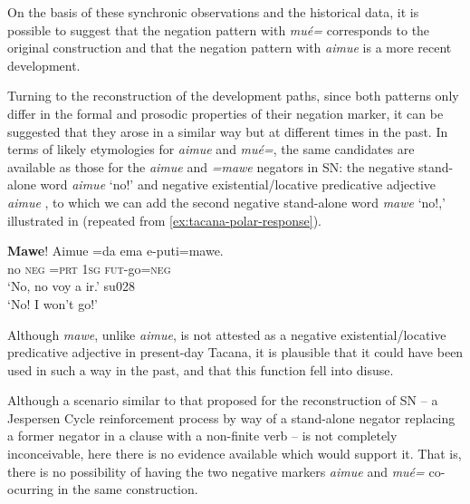 \documentclass[output=paper,draft,draftmode,colorlinks,citecolor=brown]{langscibook}
\begin{document}
On the basis of these synchronic observations and the historical data, it is possible to suggest that the negation pattern with \textit{mué=} corresponds to the original construction and that the negation pattern with \textit{aimue} is a more recent development.

Turning to the reconstruction of the development paths, since both patterns
only differ in the formal and prosodic properties of their negation marker,
it can be suggested that they arose in a similar way but at different
times in the past. In terms of likely etymologies for \textit{aimue} and
\textit{mué=}, the same candidates are available as those for the
\textit{aimue} and \textit{=mawe} negators in SN: the negative stand-alone
word \textit{aimue} `no!'  and negative
existential\slash locative predicative adjective \textit{aimue}
, to which we can add the second negative
stand-alone word \textit{mawe} `no!,' illustrated in
 (repeated from \ref{ex:tacana-polar-response}).
%
\begin{exe}\ex\label{ex:tacana-not-to-mass}
\gll \textbf{Mawe}!  Aimue  =da  ema  e-puti=mawe.\\
    no  \textsc{neg}  \textsc{=prt}  \textsc{1sg}
    \textsc{fut}-go=\textsc{neg}\\
\glt `No, no voy a ir.' su028\\
`No! I won't go!'
\end{exe}
%
Although \textit{mawe}, unlike \textit{aimue}, is not attested as a negative existential\slash locative predicative adjective in present-day Tacana, it is plausible that it could have been used in such a way in the past, and that this function fell into disuse.

Although a scenario similar to that proposed for the reconstruction of
SN -- a Jespersen Cycle reinforcement process by way of a stand-alone
negator replacing a former negator in a clause with a non-finite verb -- is
not completely inconceivable, here there is no evidence available which
would support it. That is, there is no possibility of having the two
negative markers \textit{aimue} and \textit{mué=} co-ocurring in the same
construction.
\end{document}
